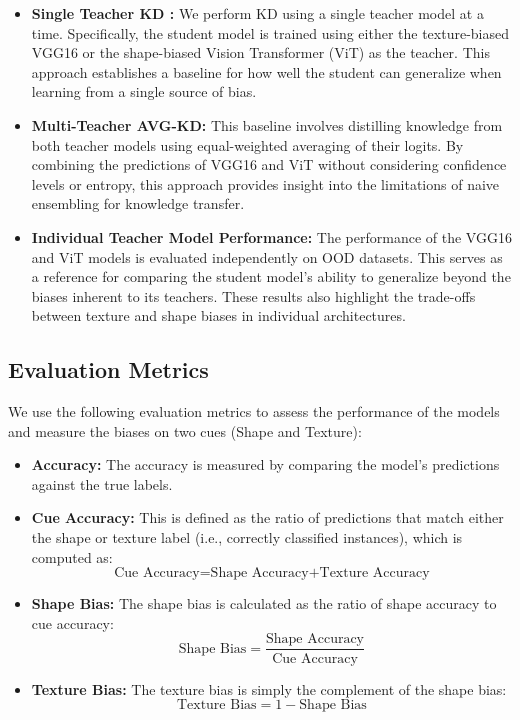 \documentclass{article}
\begin{document}
\begin{itemize}[noitemsep, topsep=0pt]
    \item \textbf{Single Teacher KD \cite{hinton2015distilling}:}
    We perform KD using a single teacher model at a time. Specifically, the student model is trained using either the texture-biased VGG16 or the shape-biased Vision Transformer (ViT) as the teacher. This approach establishes a baseline for how well the student can generalize when learning from a single source of bias.

    \item \textbf{Multi-Teacher AVG-KD:}
    This baseline involves distilling knowledge from both teacher models using equal-weighted averaging of their logits. By combining the predictions of VGG16 and ViT without considering confidence levels or entropy, this approach provides insight into the limitations of naive ensembling for knowledge transfer.

    \item \textbf{Individual Teacher Model Performance:}
    The performance of the VGG16 and ViT models is evaluated independently on OOD datasets. This serves as a reference for comparing the student model’s ability to generalize beyond the biases inherent to its teachers. These results also highlight the trade-offs between texture and shape biases in individual architectures.
\end{itemize}

\subsection{Evaluation Metrics}
We use the following evaluation metrics to assess the performance of the models and measure the biases on two cues (Shape and Texture):

\begin{itemize}[noitemsep, topsep=0pt]
    \item \textbf{Accuracy:} The accuracy is measured by comparing the model's predictions against the true labels.
    \item \textbf{Cue Accuracy\cite{gavrikov2024vision}:} This is defined as the ratio of predictions that match either the shape or texture label (i.e., correctly classified instances), which is computed as:
    \[
    \text{Cue Accuracy=Shape Accuracy+Texture Accuracy}
    \]
    \item \textbf{Shape Bias:} The shape bias is calculated as the ratio of shape accuracy to cue accuracy:
    \[
    \text{Shape Bias} = \frac{\text{Shape Accuracy}}{\text{Cue Accuracy}}
    \]
    \item \textbf{Texture Bias:} The texture bias is simply the complement of the shape bias:
    \[
    \text{Texture Bias} = 1 - \text{Shape Bias}
    \]
\end{itemize}
\end{document}
